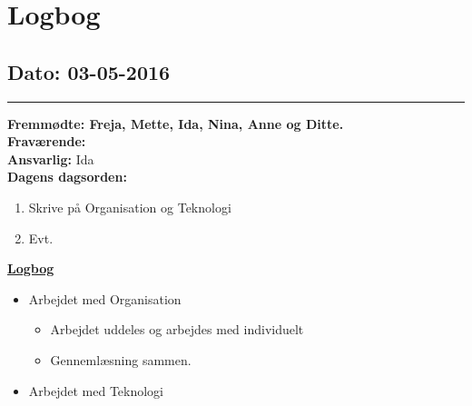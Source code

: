 \chapter{Logbog}
\section{Dato: 03-05-2016}
\hrule
\textbf{Fremmødte: Freja, Mette, Ida, Nina, Anne og Ditte.} \\
\textbf{Fraværende: } \\
\textbf{Ansvarlig: } Ida \\
\textbf{Dagens dagsorden: }
\begin{enumerate}
	\item Skrive på Organisation og Teknologi
	\item Evt. 
\end{enumerate}

\underline{\textbf{Logbog}}
\begin{itemize}
\item Arbejdet med Organisation
\begin{itemize}
\item Arbejdet uddeles og arbejdes med individuelt
\item Gennemlæsning sammen.
\end{itemize}
\item Arbejdet med Teknologi
\end{itemize}
